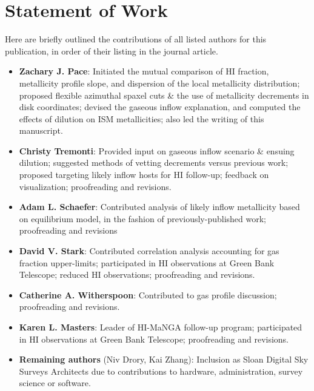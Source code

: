 \chapappendix

\section{Statement of Work}
\label{chap3:apdx:statement_of_work}

Here are briefly outlined the contributions of all listed authors for this publication, in order of their listing in the journal article.

\begin{itemize}
    \item \textbf{Zachary J. Pace}: Initiated the mutual comparison of HI fraction, metallicity profile slope, and dispersion of the local metallicity distribution; proposed flexible azimuthal spaxel cuts \& the use of metallicity decrements in disk coordinates; devised the gaseous inflow explanation, and computed the effects of dilution on ISM metallicities; also led the writing of this manuscript.
    \item \textbf{Christy Tremonti}: Provided input on gaseous inflow scenario \& ensuing dilution; suggested methods of vetting decrements versus previous work; proposed targeting likely inflow hosts for HI follow-up; feedback on visualization; proofreading and revisions.
    \item \textbf{Adam L. Schaefer}: Contributed analysis of likely inflow metallicity based on equilibrium model, in the fashion of previously-published work; proofreading and revisions
    \item \textbf{David V. Stark}: Contributed correlation analysis accounting for gas fraction upper-limits; participated in HI observations at Green Bank Telescope; reduced HI observations; proofreading and revisions.
    \item \textbf{Catherine A. Witherspoon}: Contributed to gas profile discussion; proofreading and revisions.
    \item \textbf{Karen L. Masters}: Leader of HI-MaNGA follow-up program;  participated in HI observations at Green Bank Telescope; proofreading and revisions.
    \item \textbf{Remaining authors} (Niv Drory, Kai Zhang): Inclusion as Sloan Digital Sky Surveys Architects due to contributions to hardware, administration, survey science or software.
\end{itemize}

\endchapappendix